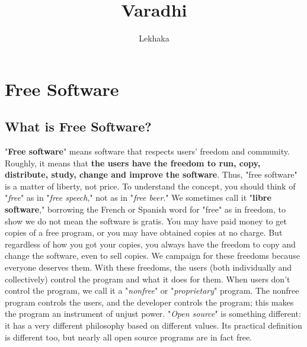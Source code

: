 \documentclass[6pt,a4paper]{report}
\author{Lekhaka}
\title{Varadhi}
\begin{document}
\maketitle
\chapter{Free Software}
\section*{What is Free Software?}
"\textbf{Free software}" means software that respects users' freedom and community. 
Roughly, it means that \textbf{the users have the freedom to run, copy, distribute, study, 
change and improve the software}. Thus, "free software" is a matter of liberty, not price. 
To understand the concept, you should think of "\textit{free}" as in "\textit{free 
speech}," not as in "\textit{free beer}." We sometimes call it "\textbf{libre software}," 
borrowing the French or Spanish word for "free" as in freedom, to show we do not mean 
the software is gratis.
You may have paid money to get copies of a free program, or you may have obtained copies 
at no charge. But regardless of how you got your copies, you always have the freedom to 
copy and change the software, even to sell copies.
We campaign for these freedoms because everyone deserves them. With these freedoms, 
the users (both individually and collectively) control the program and what it does for 
them. When users don't control the program, we call it a "\textit{nonfree}" or 
"\textit{proprietary}" program. The nonfree program controls the users, and the 
developer controls the program; this makes the program an instrument of unjust power.
"\emph{Open source}" is something different: it has a very different philosophy based on 
different values. Its practical definition is different too, but nearly all open source 
programs are in fact free. 
\end{document}

